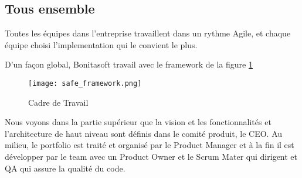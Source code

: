 \subsection{Tous ensemble}

Toutes les équipes dans l'entreprise travaillent dans un rythme Agile, et chaque équipe choisi l'implementation qui le convient le plus.

D'un façon global, Bonitasoft travail avec le framework de la figure \ref{frame_safe}

\begin{figure}[!ht]
\centering
\texttt{[image: safe\_framework.png]}
\caption{Cadre de Travail \cite{safe}}
\label{frame_safe}
\end{figure}

Nous voyons dans la partie supérieur que la vision et les fonctionnalités et l'architecture de haut niveau sont définis dans le comité produit, le CEO.
Au milieu, le portfolio est traité et organisé par le Product Manager et à la fin il est développer par le team avec un Product Owner et le Scrum Mater qui dirigent et QA qui assure la qualité du code.
